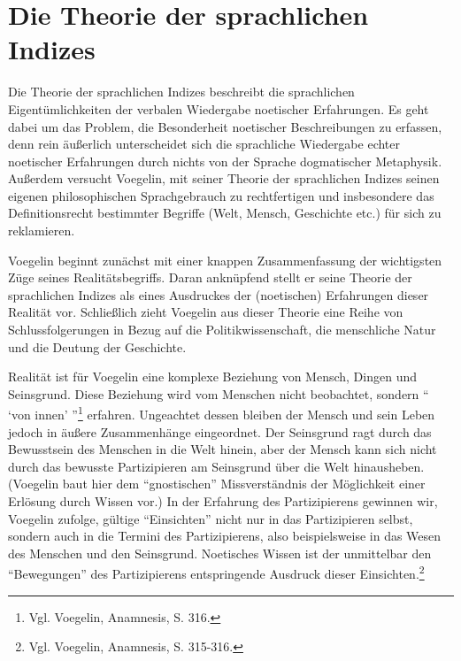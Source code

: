 \section{Die Theorie der sprachlichen Indizes}
\label{IndizesTheorie}
Die Theorie der sprachlichen Indizes beschreibt die sprachlichen
Eigentümlichkeiten der verbalen Wiedergabe noetischer Erfahrungen. Es geht
dabei um das Problem, die Besonderheit noetischer Beschreibungen zu erfassen,
denn rein äußerlich unterscheidet sich die sprachliche Wiedergabe echter
noetischer Erfahrungen durch nichts von der Sprache dogmatischer Metaphysik.
Außerdem versucht Voegelin, mit seiner Theorie der sprachlichen Indizes seinen
eigenen philosophischen Sprachgebrauch zu rechtfertigen und insbesondere das
Definitionsrecht bestimmter Begriffe (Welt, Mensch, Geschichte etc.) für sich
zu reklamieren.

Voegelin beginnt zunächst mit einer knappen Zusammenfassung der wichtigsten
Züge seines Realitätsbegriffs. Daran anknüpfend stellt er seine Theorie der
sprachlichen Indizes als eines Ausdruckes der (noetischen) Erfahrungen dieser
Realität vor. Schließlich zieht Voegelin aus dieser Theorie eine Reihe von
Schlussfolgerungen in Bezug auf die Politikwissenschaft, die menschliche Natur
und die Deutung der Geschichte.

Realität ist für Voegelin eine komplexe Beziehung von Mensch, Dingen und
Seinsgrund. Diese Beziehung wird vom Menschen nicht beobachtet, sondern "`
`von innen' "'\footnote{Vgl. Voegelin, Anamnesis, S. 316.} erfahren.
Ungeachtet dessen bleiben der Mensch und sein Leben jedoch in äußere
Zusammenhänge eingeordnet. Der Seinsgrund ragt durch das Bewusstsein des
Menschen in die Welt hinein, aber der Mensch kann sich nicht durch das
bewusste Partizipieren am Seinsgrund über die Welt hinausheben. (Voegelin baut
hier dem "`gnostischen"' Missverständnis der Möglichkeit einer Erlösung durch
Wissen vor.)  In der Erfahrung des Partizipierens gewinnen wir, Voegelin
zufolge, gültige "`Einsichten"' nicht nur in das Partizipieren selbst, sondern
auch in die Termini des Partizipierens, also beispielsweise in das Wesen des
Menschen und den Seinsgrund. Noetisches Wissen ist der unmittelbar den
"`Bewegungen"' des Partizipierens entspringende Ausdruck dieser
Einsichten.\footnote{Vgl.  Voegelin, Anamnesis, S. 315-316.}


